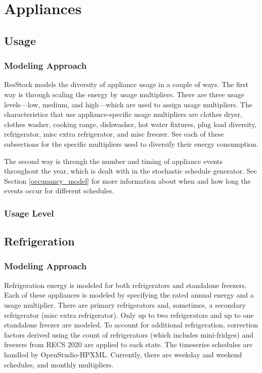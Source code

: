 \section{Appliances}

\subsection{Usage} \label{usage_level}
\subsubsection{Modeling Approach}
ResStock models the diversity of appliance usage in a couple of ways. The first way is through scaling the energy by usage multipliers. There are three usage levels---low, medium, and high---which are used to assign usage multipliers. The characteristics that use appliance-specific usage multipliers are clothes dryer, clothes washer, cooking range, dishwasher, hot water fixtures, plug load diversity, refrigerator, misc extra refrigerator, and misc freezer. See each of these subsections for the specific multipliers used to diversify their energy consumption.

The second way is through the number and timing of appliance events throughout the year, which is dealt with in the stochastic schedule generator. See Section \ref{occupancy_model} for more information about when and how long the events occur for different schedules.

\subsubsection{Usage Level}


\subsection{Refrigeration}
\subsubsection{Modeling Approach}
Refrigeration energy is modeled for both refrigerators and standalone freezers. Each of these appliances is modeled by specifying the rated annual energy and a usage multiplier.
There are primary refrigerators and, sometimes, a secondary refrigerator (misc extra refrigerator). Only up to two refrigerators and up to one standalone freezer are modeled.
To account for additional refrigeration, correction factors derived using the count of refrigerators (which includes mini-fridges) and freezers from RECS 2020 are applied to each state.
The timeseries schedules are handled by OpenStudio-HPXML. Currently, there are weekday and weekend schedules, and monthly multipliers.


